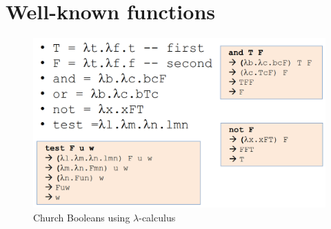 \section{Well-known functions}
\begin{figure}[htbp]
   \centering
   \includegraphics{images/lambda_booleans.png}
   \caption{Church Booleans using $\lambda$-calculus}
   \label{fig:lambda_booleans}
\end{figure}

